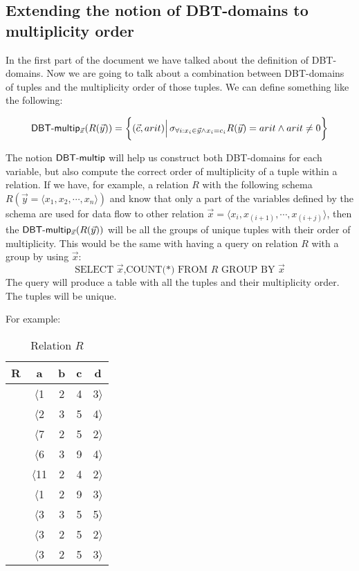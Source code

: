 \documentclass[12pt]{article}
\begin{document}
\subsection{Extending the notion of DBT-domains to multiplicity order}

In the first part of the document we have talked about the definition of DBT-domains. Now we are going to talk about a combination between DBT-domains of tuples and the multiplicity order of those tuples. We can define something like the following:

$$\textsf{DBT-multip}{}_{\vec x}(R(\vec y))=\bigg\{(\vec c,arit)\Big|\,\sigma_{\forall i:x_i\in\vec{y}\land x_{i}=c_{i}}R(\vec y)= arit \land arit \not= 0\bigg\}$$ 

The notion $\textsf{DBT-multip}{}$ will help us construct both DBT-domains for each variable, but also compute the correct order of multiplicity of a tuple within a relation. If we have, for example, a relation $R$ with the following schema $R(\vec y=\langle x_1,x_2,\cdots,x_n\rangle)$ and know that only a part of the variables defined by the schema are used for data flow to other relation $\vec x=\langle x_i,x_{(i+1)},\cdots,x_{(i+j)}\rangle$, then the $\textsf{DBT-multip}{}_{\vec x}(R(\vec y))$ will be all the groups of unique tuples with their order of multiplicity. This would be the same with having a query on relation $R$ with a group by using $\vec x$:
$$\mbox{SELECT }\vec{x} \mbox{,COUNT(*) FROM }R \mbox{ GROUP BY }\vec{x}$$
The query will produce a table with all the tuples and their multiplicity order. The tuples will be unique.

For example:

\begin{table}[H]
\centering
\begin{tabular}{c c c c c}
	R & a & b & c & d\\ [0.2ex]
	\hline
	  & $\langle $1 & 2 & 4& 3$\rangle$\\
	  & $\langle $2 & 3 & 5 & 4$\rangle$\\
	  & $\langle $7 & 2 & 5 & 2$\rangle$\\
	  & $\langle $6 & 3 & 9 & 4$\rangle$\\
	  & $\langle $11 & 2 & 4 & 2$\rangle$\\
	  & $\langle $1 & 2 & 9 & 3$\rangle$\\
	  & $\langle $3 & 3 & 5 & 5$\rangle$\\
	  & $\langle $3 & 2 & 5 & 2$\rangle$\\
	  & $\langle $3 & 2 & 5 & 3$\rangle$\\
\end{tabular}
\caption{Relation $R$}
\end{table}
\end{document}
